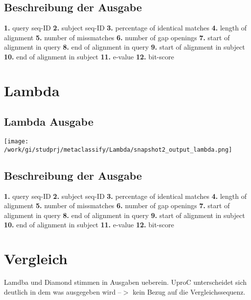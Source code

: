 \documentclass[11pt, a4paper]{scrartcl}
\begin{document}
\subsection{Beschreibung der Ausgabe}
\begin{flushleft}
\textbf{1.} query seq-ID\linebreak
\textbf{2.} subject seq-ID\linebreak
\textbf{3.} percentage of identical matches\linebreak
\textbf{4.} length of alignment\linebreak
\textbf{5.} number of missmatches\linebreak
\textbf{6.} number of gap openings\linebreak
\textbf{7.} start of alignment in query\linebreak
\textbf{8.} end of alignment in query\linebreak
\textbf{9.} start of alignment in subject\linebreak
\textbf{10.} end of alignment in subject\linebreak
\textbf{11.} e-value\linebreak
\textbf{12.} bit-score
\end{flushleft}
\newpage

\section{Lambda}

\subsection{Lambda Ausgabe}
\texttt{[image: /work/gi/studprj/metaclassify/Lambda/snapshot2\_output\_lambda.png]}

\subsection{Beschreibung der Ausgabe}
\begin{flushleft}
\textbf{1.} query seq-ID\linebreak
\textbf{2.} subject seq-ID\linebreak
\textbf{3.} percentage of identical matches\linebreak
\textbf{4.} length of alignment\linebreak
\textbf{5.} number of missmatches\linebreak
\textbf{6.} number of gap openings\linebreak
\textbf{7.} start of alignment in query\linebreak
\textbf{8.} end of alignment in query\linebreak
\textbf{9.} start of alignment in subject\linebreak
\textbf{10.} end of alignment in subject\linebreak
\textbf{11.} e-value\linebreak
\textbf{12.} bit-score
\end{flushleft}

\section{Vergleich}

Lamdba und Diamond stimmen in Ausgaben ueberein. UproC unterscheidet sich deutlich in dem was ausgegeben wird --$>$ kein Bezug auf die Vergleichssequenz.
\end{document}
